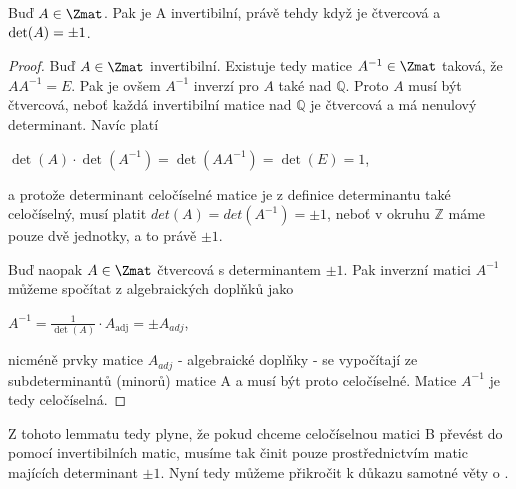 \begin{lem}
    Buď $A \in \Zmat$. Pak je A invertibilní, právě tehdy když je čtvercová a
    $\textnormal{det}(A) = \pm1$.
\end{lem}
\begin{proof}
    Buď $A \in \Zmat$ invertibilní. Existuje tedy matice $A^{-1} \in \Zmat$
    taková, že $AA^{-1} = E$. Pak je ovšem $A^{-1}$ inverzí pro $A$ také nad
    $\mathbb{Q}$. Proto $A$ musí být čtvercová, neboť každá invertibilní matice
    nad $\mathbb{Q}$ je čtvercová a má nenulový determinant. Navíc platí
    \begin{center}
        $ \det(A) \cdot \det(A^{-1}) = \det(AA^{-1}) = \det(E) = 1 $,
    \end{center}
    a protože determinant celočíselné matice je z definice determinantu
    také celočíselný, musí platit $det(A) = det(A^{-1}) = \pm1$, neboť v okruhu
    $\mathbb{Z}$ máme pouze dvě jednotky, a to právě $\pm1$.

    Buď naopak $A \in \Zmat$ čtvercová s determinantem $\pm1$. Pak inverzní
    matici $A^{-1}$ můžeme spočítat z algebraických doplňků jako
    \begin{center}
        $A^{-1} = \frac{1}{\operatorname{det}(A)} \cdot A_{\mathrm{adj}} = \pm A_{adj}$,
    \end{center}
    nicméně prvky matice $A_{adj}$ - algebraické doplňky - se vypočítají
    ze subdeterminantů (minorů) matice A a musí být proto celočíselné. Matice
    $A^{-1}$ je tedy celočíselná.
\end{proof}

Z tohoto lemmatu tedy plyne, že pokud chceme celočíselnou matici B převést do
\snf{} pomocí invertibilních matic, musíme tak činit pouze prostřednictvím
matic majících determinant $\pm1$. Nyní tedy můžeme přikročit k důkazu samotné
věty o \snf{}.

